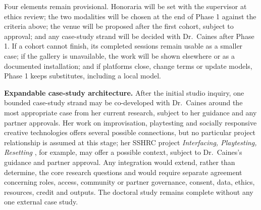 Four elements remain provisional. Honoraria will be set with the
supervisor at ethics review; the two modalities will be chosen at the end of
Phase 1 against the criteria above; the venue will be proposed after the
first cohort, subject to approval; and any case-study strand will be decided
with Dr.\ Caines after Phase 1. If a cohort cannot finish, its
completed sessions remain usable as a smaller case; if the gallery is
unavailable, the work will be shown elsewhere or as a documented
installation; and if platforms close, change terms or update models, Phase 1
keeps substitutes, including a local model.

\textbf{Expandable case-study architecture.} After the initial studio
inquiry, one bounded case-study strand may be co-developed with Dr.\ Caines
around the most appropriate case from her current research, subject to her
guidance and any partner approvals. Her work on improvisation, playtesting
and socially responsive creative technologies offers several possible
connections, but no particular project relationship is assumed at this
stage; her SSHRC project \emph{Interfacing, Playtesting, Resetting}
\citep{yfile2026sshrc}, for example, may offer a possible context, subject to
Dr.\ Caines's guidance and partner approval. Any integration would extend,
rather than determine, the core research questions and would require
separate agreement concerning roles, access, community or partner
governance, consent, data, ethics, resources, credit and outputs. The
doctoral study remains complete without any one external case study.
